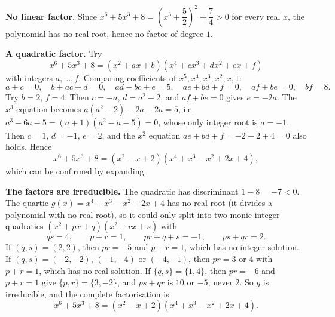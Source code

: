 \textbf{No linear factor.} Since $x^6+5x^3+8=\left(x^3+\dfrac{5}{2}\right)^2+\dfrac{7}{4}>0$ for every real $x$, the polynomial has no real root, hence no factor of degree $1$.

\textbf{A quadratic factor.} Try
\[
x^6+5x^3+8=\left(x^2+ax+b\right)\left(x^4+cx^3+dx^2+ex+f\right)
\]
with integers $a,\dots,f$. Comparing coefficients of $x^5,x^4,x^3,x^2,x,1$:
\[
a+c=0,\quad b+ac+d=0,\quad ad+bc+e=5,\quad ae+bd+f=0,\quad af+be=0,\quad bf=8 .
\]
Try $b=2$, $f=4$. Then $c=-a$, $d=a^2-2$, and $af+be=0$ gives $e=-2a$. The $x^3$ equation becomes $a(a^2-2)-2a-2a=5$, i.e.\ $a^3-6a-5=(a+1)(a^2-a-5)=0$, whose only integer root is $a=-1$. Then $c=1$, $d=-1$, $e=2$, and the $x^2$ equation $ae+bd+f=-2-2+4=0$ also holds. Hence
\[
x^6+5x^3+8=\left(x^2-x+2\right)\left(x^4+x^3-x^2+2x+4\right),
\]
which can be confirmed by expanding.

\textbf{The factors are irreducible.} The quadratic has discriminant $1-8=-7<0$. The quartic $g(x)=x^4+x^3-x^2+2x+4$ has no real root (it divides a polynomial with no real root), so it could only split into two monic integer quadratics $(x^2+px+q)(x^2+rx+s)$ with
\[
qs=4,\qquad p+r=1,\qquad pr+q+s=-1,\qquad ps+qr=2 .
\]
If $(q,s)=(2,2)$, then $pr=-5$ and $p+r=1$, which has no integer solution. If $(q,s)=(-2,-2)$, $(-1,-4)$ or $(-4,-1)$, then $pr=3$ or $4$ with $p+r=1$, which has no real solution. If $\{q,s\}=\{1,4\}$, then $pr=-6$ and $p+r=1$ give $\{p,r\}=\{3,-2\}$, and $ps+qr$ is $10$ or $-5$, never $2$. So $g$ is irreducible, and the complete factorisation is
\[
\boxed{x^6+5x^3+8=\left(x^2-x+2\right)\left(x^4+x^3-x^2+2x+4\right)}.
\]
